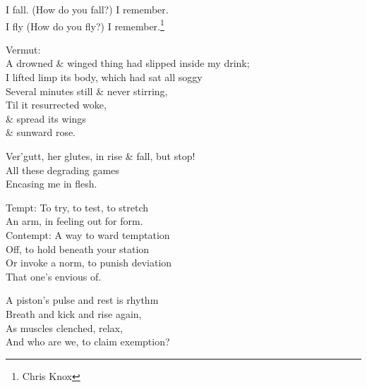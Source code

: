 
I fall. (How do you fall?) I remember. \\
I fly  (How do you fly?) I remember.\footnote{Chris Knox}

Vermut: \\
A drowned \& winged thing had slipped inside my drink; \\
I lifted limp its body, which had sat all soggy \\
Several minutes still \& never stirring, \\
Til it resurrected woke, \\
\& spread its wings \\
\& sunward rose.

Ver'gutt, her glutes, in rise \& fall, but stop! \\
All these degrading games \\
Encasing me in flesh.

Tempt: To try, to test, to stretch \\
An arm, in feeling out for form. \\
Contempt: A way to ward temptation \\
Off, to hold beneath your station \\
Or invoke a norm, to punish deviation \\
That one's envious of.

A piston's pulse and rest is rhythm  \\
Breath and kick and rise again, \\
As muscles clenched, relax, \\
And who are we, to claim exemption?